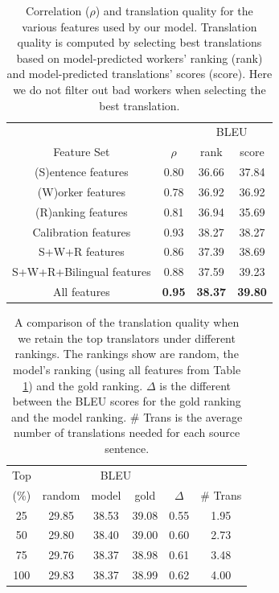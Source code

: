 \begin{table}[htbp]
 \center
\begin{tabular}{c|c|cc}
\hline
 & & \multicolumn{2}{c}{BLEU}\\
Feature Set             & $\rho$  & rank & score    \\ \hhline{====}
(S)entence features     & 0.80 & 36.66 &37.84 \\
(W)orker features       & 0.78 & 36.92 &36.92 \\
(R)anking features      & 0.81 & 36.94 &35.69\\
Calibration features  & 0.93 & 38.27 &38.27\\
S+W+R features          & 0.86 & 37.39 & 38.69\\
S+W+R+Bilingual features        & 0.88 & 37.59 &39.23 \\
All features            & \textbf{0.95} & \textbf{38.37} & \textbf{39.80}\\ \hline
\end{tabular}
\caption{\label{lrresult} Correlation ($\rho$) and translation quality for the various features used by our model.  Translation quality is computed by selecting best translations based on model-predicted workers' ranking (rank) and model-predicted translations' scores (score). Here we do not filter out bad workers when selecting the best translation.}
\end{table}



\begin{table}[htbp]
\center
\begin{tabular}{c|ccccc}
\hline
Top & \multicolumn{4}{c}{BLEU}&\\
 (\%) &random & model & gold & $\Delta$ & \# Trans\\\hhline{======}
25      &29.85& 38.53   & 39.08      & 0.55   & 1.95         \\
50      &29.80& 38.40   & 39.00      & 0.60   & 2.73         \\
75      &29.76& 38.37   & 38.98      & 0.61   & 3.48         \\
100     &29.83& 38.37   & 38.99      & 0.62   & 4.00         \\ \hline
\end{tabular}
\caption{\label{modeltoprank} A comparison of the translation quality when we retain the top translators under different rankings.  The rankings show are random, the model's ranking (using all features from Table \ref{lrresult}) and the gold ranking.  $\Delta$ is the different between the BLEU scores for the gold ranking and the model ranking. \# Trans is the average number of translations needed for each source sentence. 
}
\end{table} 
